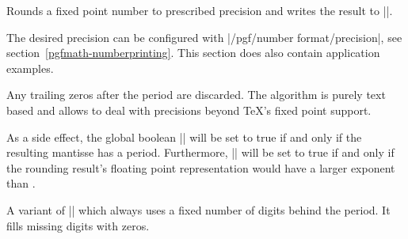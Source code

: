 \begin{command}{}
	Rounds a fixed point number to prescribed precision and writes the result to |\pgfmathresult|.

	The desired precision can be configured with |/pgf/number format/precision|, see section~\ref{pgfmath-numberprinting}. This section does also contain application examples.
	
	Any trailing zeros after the period are discarded. The algorithm is purely text based and allows to deal with precisions beyond \TeX's fixed point support.

	As a side effect, the global boolean |\ifpgfmathfloatroundhasperiod| will be set to true if and only if the resulting mantisse has a period. Furthermore, |\ifpgfmathfloatroundmayneedrenormalize| will be set to true if and only if the rounding result's floating point representation would have a larger exponent than . 
\begin{codeexample}[]
\pgfmathresult
\end{codeexample}
\begin{codeexample}[]
\pgfmathresult
\end{codeexample}
\begin{codeexample}[]
\pgfmathresult
\end{codeexample}
\end{command}

\begin{command}{}
	A variant of |\pgfmathroundto| which always uses a fixed number of digits behind the period. It fills missing digits with zeros.
\begin{codeexample}[]
\pgfmathresult
\end{codeexample}
\begin{codeexample}[]
\pgfmathresult
\end{codeexample}
\begin{codeexample}[]
\pgfmathresult
\end{codeexample}
\end{command}

